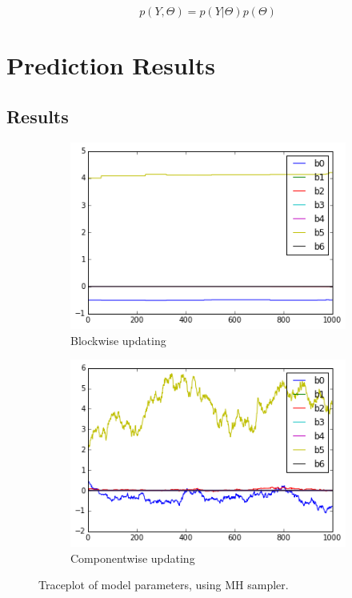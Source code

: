 \documentclass{article} %
\begin{document}
\begin{multicols}{2}
\begin{equation*}
p(Y,\Theta)=p(Y|\Theta)p(\Theta)
\end{equation*}

\section{Prediction Results}

\subsection{Results}

\begin{figure}
	\begin{subfigure}{0.5\textwidth}
		\includegraphics[width=\textwidth]{figures/trace_block}
		\caption{Blockwise updating}
		\label{fig:trace_block}
	\end{subfigure}
	\begin{subfigure}{0.5\textwidth}
		\includegraphics[width=\textwidth]{figures/trace_component}
		\caption{Componentwise updating}
		\label{fig:trace_comp}
	\end{subfigure}
	\caption{Traceplot of model parameters, using MH sampler.}
	\label{fig:trace}
\end{figure}


\end{multicols}
\end{document}
